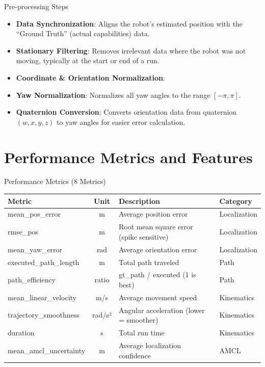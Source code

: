 \documentclass[aspectratio=169, 11pt]{beamer}
\newcommand{\fullsectiontitle}{}
\newcommand{\presentationsection}[2][]{%
  \gdef\fullsectiontitle{#2}%
  \section[#1]{#2}%
}
\begin{document}
\begin{frame}{Pre-processing Steps}
  \begin{itemize}
    \item \textbf{Data Synchronization}: Aligns the robot's estimated position with the ``Ground Truth'' (actual capabilities) data.
    \vspace{0.2cm}
    \item \textbf{Stationary Filtering}: Removes irrelevant data where the robot was not moving, typically at the start or end of a run.
    \vspace{0.2cm}
    \item \textbf{Coordinate \& Orientation Normalization}:
    \vspace{0.2cm}
    \item \textbf{Yaw Normalization}: Normalizes all yaw angles to the range $[-\pi, \pi]$.
    \vspace{0.2cm}
    \item \textbf{Quaternion Conversion}: Converts orientation data from quaternion $(w,x,y,z)$ to yaw angles for easier error calculation.
  \end{itemize}
\end{frame}

\presentationsection[Performance Metrics and Features]{Performance Metrics and Features}

\begin{frame}{Performance Metrics (8 Metrics)}
  \begin{table}
    \footnotesize
    \renewcommand{\arraystretch}{1.2}
    \begin{tabular}{@{}L{3.8cm} c L{4.5cm} L{2.2cm}@{}}
      \toprule
      \textbf{Metric} & \textbf{Unit} & \textbf{Description} & \textbf{Category} \\
      \midrule
      mean\_pos\_error & m & Average position error & Localization \\
      rmse\_pos & m & Root mean square error (spike sensitive) & Localization \\
      mean\_yaw\_error & rad & Average orientation error & Localization \\
      executed\_path\_length & m & Total path traveled & Path \\
      path\_efficiency & ratio & gt\_path / executed (1 is best) & Path \\
      mean\_linear\_velocity & m/s & Average movement speed & Kinematics \\
      trajectory\_smoothness & rad/s² & Angular acceleration (lower = smoother) & Kinematics \\
      duration & s & Total run time & Kinematics \\
      mean\_amcl\_uncertainty & m & Average localization confidence & AMCL \\
      \bottomrule
    \end{tabular}
  \end{table}
\end{frame}
\end{document}
